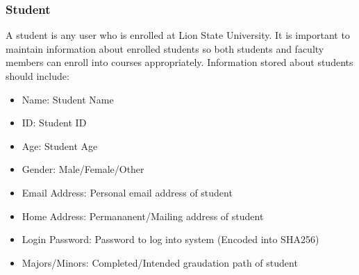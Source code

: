 \documentclass{article}
\begin{document}
    \subsubsection{Student}\label{sec:Requirements:Users:Student}
      A student is any user who is enrolled at Lion State University.  It is important to maintain information about enrolled students so both students and faculty members can enroll into courses appropriately.  Information stored about students should include:
      \begin{itemize}
        \item Name: Student Name
        \item ID: Student ID
        \item Age: Student Age
        \item Gender: Male/Female/Other
        \item Email Address: Personal email address of student
        \item Home Address: Permananent/Mailing address of student
        \item Login Password: Password to log into system (Encoded into SHA256)
        \item Majors/Minors: Completed/Intended graudation path of student
      \end{itemize}
\end{document}
